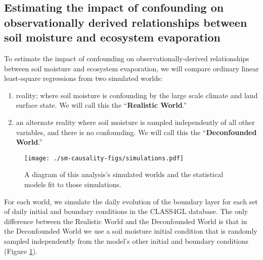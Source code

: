 \documentclass[12pt]{article}
\begin{document}
\subsection{Estimating the impact of confounding on observationally derived relationships between soil moisture and ecosystem evaporation}
\label{sec:estim-impact-conf}

To estimate the impact of confounding on observationally-derived
relationships between soil moisture and ecosystem evaporation, we will
compare ordinary linear least-square regressions from two simulated
worlds:

\begin{enumerate}
  \item reality; where soil moisture is confounding by the large scale
    climate and land surface state. We will call this the
    ``\textbf{Realistic World}.''

  \item an alternate reality where soil moisture is sampled
    independently of all other variables, and there is no
    confounding. We will call this the ``\textbf{Deconfounded
      World}.''
\end{enumerate}

\begin{figure}
  \texttt{[image: ./sm-causality-figs/simulations.pdf]}
  \caption{A diagram of this analysis's simulated worlds and the
    statistical models fit to those
    simulations.}\label{fig:simulations}
\end{figure}

For each world, we simulate the daily evolution of the boundary layer
for each set of daily initial and boundary conditions in the CLASS4GL
database. The only difference between the Realistic World and the
Deconfounded World is that in the Deconfounded World we use a soil
moisture initial condition that is randomly sampled independently from
the model's other initial and boundary conditions (Figure
\ref{fig:simulations}).
\end{document}
